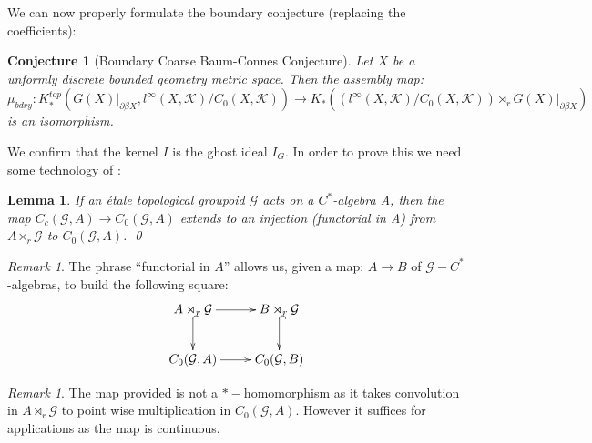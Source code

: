 \documentclass[11pt]{amsart}
\theoremstyle{plain}
\newtheorem{conj}{Conjecture}
\newtheorem{lemma}[theorem]{Lemma}%
\theoremstyle{definition}%
\theoremstyle{remark}%
\newtheorem{remark}[theorem]{Remark}%
\newcommand{\G}{\mathcal{G}}
\begin{document}
We can now properly formulate the boundary conjecture (replacing the coefficients):

\begin{conj} [Boundary Coarse Baum-Connes Conjecture]
Let $X$ be a unformly discrete bounded geometry metric space. Then the assembly map:
\begin{equation*}
\mu_{bdry}:K_{*}^{top}(G(X)|_{\partial\beta X}, l^{\infty}(X,\mathcal{K})/C_{0}(X,\mathcal{K})) \rightarrow K_{*}((l^{\infty}(X,\mathcal{K})/C_{0}(X,\mathcal{K}))\rtimes_{r}G(X)|_{\partial\beta X})
\end{equation*}
is an isomorphism.
\end{conj}

We confirm that the kernel $I$ is the ghost ideal $I_{G}$. In order to prove this we need some technology of \cite{MR1911663}:

\begin{lemma}\label{Lem:Lemma9}\cite[Lemma 9]{MR1911663}
If an \'etale topological groupoid $\G$ acts on a $C^{*}$-algebra A, then the map $C_{c}(\G,A) \rightarrow C_{0}(\G,A)$ extends to an injection (functorial in A) from $A\rtimes_{r} \G$ to $C_{0}(\G,A)$. \qed
\end{lemma}

\begin{remark}
The phrase ``functorial in $A$'' allows us, given a map: $A \rightarrow B$ of $\G-C^{*}$-algebras, to build the following square:
\begin{equation*}
\xymatrix{A\rtimes_{r} \G \ar@{->}[r] \ar@{^{(}->}[d] &B \rtimes_{r} \G \ar@{^{(}->}[d]\\
C_{0}(\G ,A)\ar@{->}[r] &   C_{0}(\G ,B)
}
\end{equation*}
\end{remark}

\begin{remark}
The map provided is not a $*-$homomorphism as it takes convolution in $A\rtimes_{r} \G$ to point wise multiplication in $C_{0}(\G,A)$. However it suffices for applications as the map is continuous.
\end{remark}
\end{document}

